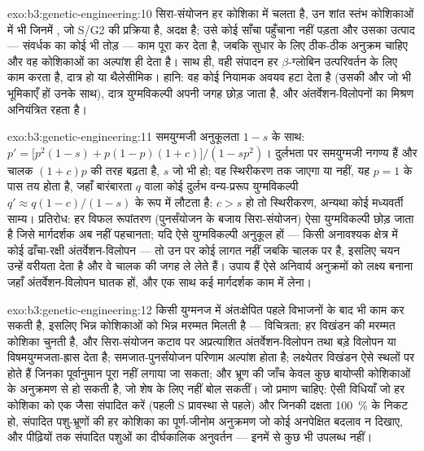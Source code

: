 \begin{solution}{exo:b3:genetic-engineering:10}
सिरा-संयोजन हर कोशिका में चलता है, उन शांत स्तंभ कोशिकाओं में भी जिनमें
, जो S/G2 की प्रक्रिया है, अदक्ष है; उसे कोई साँचा
पहुँचाना नहीं पड़ता और उसका उत्पाद --- संवर्धक का कोई भी तोड़ --- काम
पूरा कर देता है, जबकि सुधार के लिए ठीक-ठीक अनुक्रम चाहिए और वह
कोशिकाओं का अल्पांश ही देता है। साथ ही, वही संपादन हर $\beta$-ग्लोबिन
उत्परिवर्तन के लिए काम करता है, दात्र हो या थैलेसीमिक। हानि: वह कोई
नियामक अवयव हटा देता है (उसकी और जो भी भूमिकाएँ हों उनके साथ), दात्र
युग्मविकल्पी अपनी जगह छोड़ जाता है, और अंतर्वेशन-विलोपनों का मिश्रण
अनियंत्रित रहता है।
\end{solution}

\begin{solution}{exo:b3:genetic-engineering:11}
समयुग्मजी अनुकूलता $1 - s$ के साथ: $p' = \bigl[p^{2}(1-s) + p(1-p)(1+c)
\bigr]/(1 - sp^{2})$। दुर्लभता पर समयुग्मजी नगण्य हैं और चालक
$(1+c)p$ की तरह बढ़ता है, $s$ जो भी हो; वह स्थिरीकरण तक जाएगा या नहीं, यह $p = 1$
के पास तय होता है, जहाँ बारंबारता $q$ वाला कोई दुर्लभ वन्य-प्ररूप
युग्मविकल्पी $q' \approx q(1-c)/(1-s)$ के रूप में लौटता है: $c > s$ हो
तो स्थिरीकरण, अन्यथा कोई मध्यवर्ती साम्य। प्रतिरोध: हर विफल रूपांतरण
(पुनर्संयोजन के बजाय सिरा-संयोजन) ऐसा युग्मविकल्पी छोड़ जाता है जिसे
मार्गदर्शक अब नहीं पहचानता; यदि ऐसे युग्मविकल्पी अनुकूल हों --- किसी
अनावश्यक क्षेत्र में कोई ढाँचा-रक्षी अंतर्वेशन-विलोपन --- तो उन पर कोई
लागत नहीं जबकि चालक पर है, इसलिए चयन उन्हें वरीयता देता है और वे चालक
की जगह ले लेते हैं। उपाय हैं ऐसे अनिवार्य अनुक्रमों को लक्ष्य बनाना
जहाँ अंतर्वेशन-विलोपन घातक हों, और एक साथ कई मार्गदर्शक काम में लेना।
\end{solution}

\begin{solution}{exo:b3:genetic-engineering:12}
किसी युग्मनज में अंतःक्षेपित  पहले विभाजनों के बाद भी काम कर सकती
है, इसलिए भिन्न कोशिकाओं को भिन्न मरम्मत मिलती है --- विचित्रता; हर
विखंडन की मरम्मत कोशिका चुनती है, और सिरा-संयोजन कटाव पर अप्रत्याशित
अंतर्वेशन-विलोपन तथा बड़े विलोपन या विषमयुग्मजता-ह्रास देता है;
समजात-पुनर्संयोजन परिणाम अल्पांश होता है; लक्ष्येतर विखंडन ऐसे स्थलों
पर होते हैं जिनका पूर्वानुमान पूरा नहीं लगाया जा सकता; और भ्रूण की
जाँच केवल कुछ बायोप्सी कोशिकाओं के अनुक्रमण से हो सकती है, जो शेष के
लिए नहीं बोल सकतीं। जो प्रमाण चाहिए: ऐसी विधियाँ जो हर कोशिका को एक
जैसा संपादित करें (पहली S प्रावस्था से पहले) और जिनकी दक्षता
\qty{100}{\%} के निकट हो, संपादित पशु-भ्रूणों की हर कोशिका का
पूर्ण-जीनोम अनुक्रमण जो कोई अनपेक्षित बदलाव न दिखाए, और पीढ़ियों तक
संपादित पशुओं का दीर्घकालिक अनुवर्तन --- इनमें से कुछ भी उपलब्ध नहीं।
\end{solution}


